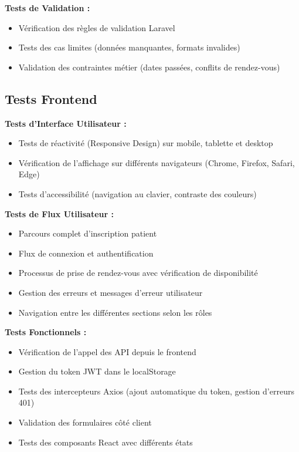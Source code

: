 \documentclass[12pt,a4paper]{report}
\begin{document}
\textbf{Tests de Validation :}
\begin{itemize}
    \item Vérification des règles de validation Laravel
    \item Tests des cas limites (données manquantes, formats invalides)
    \item Validation des contraintes métier (dates passées, conflits de rendez-vous)
\end{itemize}

\subsection{Tests Frontend}

\textbf{Tests d'Interface Utilisateur :}
\begin{itemize}
    \item Tests de réactivité (Responsive Design) sur mobile, tablette et desktop
    \item Vérification de l'affichage sur différents navigateurs (Chrome, Firefox, Safari, Edge)
    \item Tests d'accessibilité (navigation au clavier, contraste des couleurs)
\end{itemize}

\textbf{Tests de Flux Utilisateur :}
\begin{itemize}
    \item Parcours complet d'inscription patient
    \item Flux de connexion et authentification
    \item Processus de prise de rendez-vous avec vérification de disponibilité
    \item Gestion des erreurs et messages d'erreur utilisateur
    \item Navigation entre les différentes sections selon les rôles
\end{itemize}

\textbf{Tests Fonctionnels :}
\begin{itemize}
    \item Vérification de l'appel des API depuis le frontend
    \item Gestion du token JWT dans le localStorage
    \item Tests des intercepteurs Axios (ajout automatique du token, gestion d'erreurs 401)
    \item Validation des formulaires côté client
    \item Tests des composants React avec différents états
\end{itemize}
\end{document}
